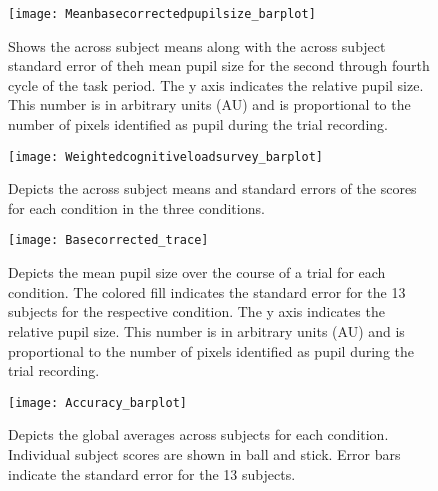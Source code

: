 \documentclass[12pt]{article}
\begin{document}
\begin{figure}[p]
  \centering
  \texttt{[image: Meanbasecorrectedpupilsize\_barplot]}
  \caption{Shows the across subject means along with the across
  subject standard error of theh mean pupil size for the second
  through fourth cycle of the task period. The y axis indicates the
  relative pupil size.  This number is in arbitrary units (AU) and
  is proportional to the number of pixels identified as pupil during
  the trial recording.}
  \label{psBarplot}
\end{figure}

\begin{figure}[p]
  \centering
  \texttt{[image: Weightedcognitiveloadsurvey\_barplot]}
  \caption{Depicts the across subject means and standard errors of
  the scores for each condition in the three conditions.  }
  \label{cogLoad}
\end{figure}

\begin{figure}[p]
  \centering
  \texttt{[image: Basecorrected\_trace]}
  \caption{Depicts the mean pupil size over the course of a trial
  for each condition.  The colored fill indicates the standard error
  for the 13 subjects for the respective condition.  The y axis indicates the
  relative pupil size.  This number is in arbitrary units (AU) and
  is proportional to the number of pixels identified as pupil during
  the trial recording.}
  \label{trialtrace}
\end{figure}

\begin{figure}[p]
  \centering
  \texttt{[image: Accuracy\_barplot]}
  \caption{Depicts the global averages across subjects for each
  condition.  Individual subject scores are shown in ball and stick.  Error bars
  indicate the standard error for the 13 subjects.}
  \label{accuracy}
\end{figure}
\end{document}
